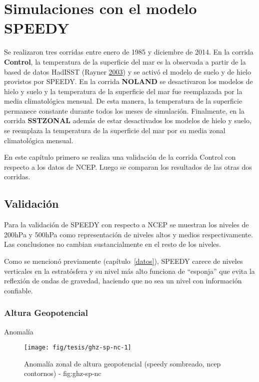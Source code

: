 \documentclass[spanish,a4paper,12p]{book}
\begin{document}
\chapter{Simulaciones con el modelo
SPEEDY}\label{simulaciones-con-el-modelo-speedy}

Se realizaron tres corridas entre enero de 1985 y diciembre de 2014. En
la corrida \textbf{Control}, la temperatura de la superficie del mar es
la observada a partir de la based de datos HadISST (Rayner
\protect\hyperlink{ref-Rayner2003}{2003}) y se activó el modelo de suelo
y de hielo provistos por SPEEDY. En la corrida \textbf{NOLAND} se
desactivaron los modelos de hielo y suelo y la temperatura de la
superficie del mar fue reemplazada por la media climatológica mensual.
De esta manera, la temperatura de la superficie permanece constante
durante todos los meses de simulación. Finalmente, en la corrida
\textbf{SSTZONAL} además de estar desactivados los modelos de hielo y
suelo, se reemplaza la temperatura de la superficie del mar por su media
zonal climatológica mensual.

En este capítulo primero se realiza una validación de la corrida Control
con respecto a los datos de NCEP. Luego se comparan los resultados de
las otras dos corridas.

\section{Validación}\label{validacion}

Para la validación de SPEEDY con respecto a NCEP se muestran los niveles
de 200hPa y 500hPa como representación de niveles altos y medios
respectivamente. Las conclusiones no cambian sustancialmente en el resto
de los niveles.

Como se mencionó previamente (capítulo~\ref{datos}), SPEEDY carece de
niveles verticales en la estratósfera y su nivel más alto funciona de
``esponja'' que evita la reflexión de ondas de gravedad, haciendo que no
sea un nivel con información confiable.

\subsection{Altura Geopotencial}\label{altura-geopotencial-1}

Anomalía

\begin{landscape}\begin{figure}

{\centering \texttt{[image: fig/tesis/ghz-sp-nc-1]} 

}

\caption{Anomalía zonal de altura geopotencial (speedy sombreado, ncep contornos) - fig:ghz-sp-nc}\label{fig:ghz-sp-nc}
\end{figure}
\end{landscape}
\end{document}
